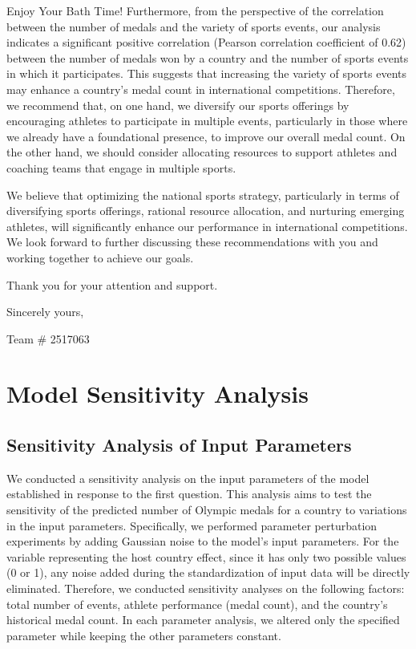 \documentclass{mcmthesis}
\begin{document}
\begin{letter}{Enjoy Your Bath Time!}
Furthermore, from the perspective of the correlation between the number of medals and the variety of sports events, our analysis indicates a significant positive correlation (Pearson correlation coefficient of 0.62) between the number of medals won by a country and the number of sports events in which it participates. This suggests that increasing the variety of sports events may enhance a country's medal count in international competitions. Therefore, we recommend that, on one hand, we diversify our sports offerings by encouraging athletes to participate in multiple events, particularly in those where we already have a foundational presence, to improve our overall medal count. On the other hand, we should consider allocating resources to support athletes and coaching teams that engage in multiple sports.

We believe that optimizing the national sports strategy, particularly in terms of diversifying sports offerings, rational resource allocation, and nurturing emerging athletes, will significantly enhance our performance in international competitions. We look forward to further discussing these recommendations with you and working together to achieve our goals.

Thank you for your attention and support.

\vspace{\parskip}

Sincerely yours,

Team \# 2517063

\end{letter}

\newpage

\section{Model Sensitivity Analysis}
\subsection{Sensitivity Analysis of Input Parameters}
We conducted a sensitivity analysis on the input parameters of the model established in response to the first question. This analysis aims to test the sensitivity of the predicted number of Olympic medals for a country to variations in the input parameters. Specifically, we performed parameter perturbation experiments by adding Gaussian noise to the model's input parameters. For the variable representing the host country effect, since it has only two possible values (0 or 1), any noise added during the standardization of input data will be directly eliminated. Therefore, we conducted sensitivity analyses on the following factors: total number of events, athlete performance (medal count), and the country's historical medal count. In each parameter analysis, we altered only the specified parameter while keeping the other parameters constant.
\end{document}
